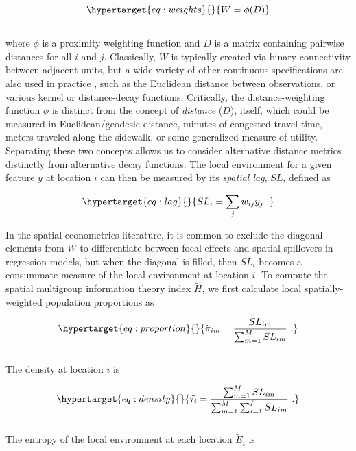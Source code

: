 \documentclass[
  10pt,
]{article}
\begin{document}
\begin{equation}\protect\hypertarget{eq:weights}{}{
W = \phi(D)
}\label{eq:weights}\end{equation}\\
where \(\phi\) is a proximity weighting function and \(D\) is a matrix
containing pairwise distances for all \(i\) and \(j\). Classically,
\(W\) is typically created via binary connectivity between adjacent
units, but a wide variety of other continuous specifications are also
used in practice
\citep{getis2009SpatialWeights, rey2010PySALPython, halleckvega2015SLXMODEL},
such as the Euclidean distance between observations, or various kernel
or distance-decay functions. Critically, the distance-weighting function
\(\phi\) is distinct from the concept of \emph{distance} (\(D\)),
itself, which could be measured in Euclidean/geodesic distance, minutes
of congested travel time, meters traveled along the sidewalk, or some
generalized measure of utility. Separating these two concepts allows us
to consider alternative distance metrics distinctly from alternative
decay functions. The local environment for a given feature \(y\) at
location \(i\) can then be measured by its \emph{spatial lag}, \(SL\),
defined as

\begin{equation}\protect\hypertarget{eq:lag}{}{
SL_i = \sum_j w_{ij} y_j \ .
}\label{eq:lag}\end{equation}

In the spatial econometrics literature, it is common to exclude the
diagonal elements from \(W\) to differentiate between focal effects and
spatial spillovers in regression models, but when the diagonal is
filled, then \(SL_i\) becomes a consummate measure of the local
environment at location \(i\). To compute the spatial multigroup
information theory index \(\tilde{H}\), we first calculate local
spatially-weighted population proportions as

\begin{equation}\protect\hypertarget{eq:proportion}{}{
\tilde{\pi}_{im} = \frac{SL_{im}}{\sum^M_{m=1}{SL_{im}}} \ .
}\label{eq:proportion}\end{equation}\\
The density at location \(i\) is

\begin{equation}\protect\hypertarget{eq:density}{}{
\tilde{\tau_i} = \frac{\sum^M_{m=1}{SL_{im}}}{\sum^M_{m=1}\sum^I_{i=1}{SL_{im}}} \ .
}\label{eq:density}\end{equation}\\
The entropy of the local environment at each location \(\tilde{E}_i\) is
\end{document}

